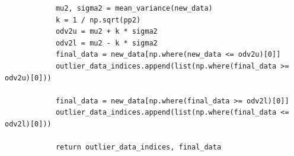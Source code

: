 {\begin{itemize}
\begin{itemize}
\begin{verbatim}
            mu2, sigma2 = mean_variance(new_data)
            k = 1 / np.sqrt(pp2)
            odv2u = mu2 + k * sigma2
            odv2l = mu2 - k * sigma2
            final_data = new_data[np.where(new_data <= odv2u)[0]]
            outlier_data_indices.append(list(np.where(final_data >= odv2u)[0]))
            
            final_data = new_data[np.where(final_data >= odv2l)[0]]
            outlier_data_indices.append(list(np.where(final_data <= odv2l)[0]))
            
            return outlier_data_indices, final_data
            \end{verbatim}
        \end{itemize}
    \end{itemize}
    
    }
    
